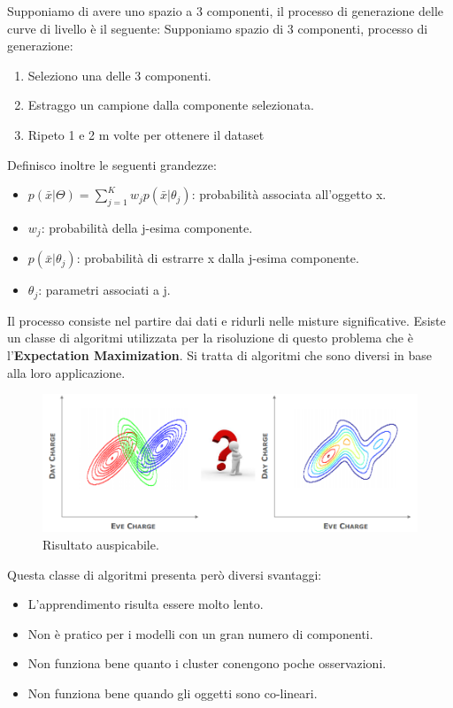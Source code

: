 Supponiamo di avere uno spazio a 3 componenti, il processo di generazione delle curve di livello è il seguente:
Supponiamo spazio di 3 componenti, processo di generazione:
\begin{enumerate}
	\item Seleziono una delle 3 componenti.
	\item Estraggo un campione dalla componente selezionata.
	\item Ripeto 1 e 2 m volte per ottenere il dataset
\end{enumerate} 

Definisco inoltre le seguenti grandezze:



\begin{itemize}
	\item $p(\bar{x}|\Theta) = \sum_{j=1}^{K} w_j p(\bar{x}|\theta_j)$: probabilità associata all'oggetto x.
	\item $w_j$: probabilità della j-esima componente.
	\item $p(\bar{x}|\theta_j)$: probabilità di estrarre x dalla j-esima componente.
	\item $\theta_j$: parametri associati a j.
\end{itemize}

Il processo consiste nel partire dai dati e ridurli nelle misture significative.
Esiste un classe di algoritmi utilizzata per la risoluzione di questo problema che è l'\textbf{Expectation Maximization}. Si tratta di algoritmi che sono diversi in base alla loro applicazione. 

\begin{figure}[H]
	\centering
	\includegraphics[height=0.3 \linewidth]{clustering/pict/expectation_maximization.png}
	\caption{Risultato auspicabile.}
\end{figure}
Questa classe di algoritmi presenta però diversi svantaggi:

\begin{itemize}
	\item L'apprendimento risulta essere molto lento.
	\item Non è pratico per i modelli con un gran numero di componenti.
	\item Non funziona bene quanto i cluster conengono  poche osservazioni.
	\item Non funziona bene quando gli oggetti sono co-lineari.
\end{itemize}

